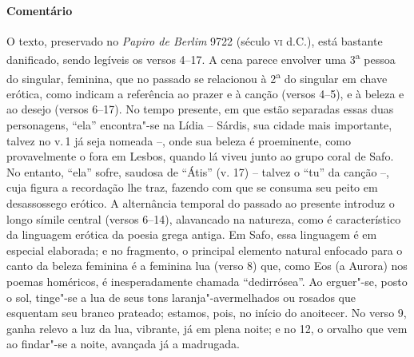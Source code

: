 {\paragraph{Comentário} O texto, preservado no \textit{Papiro de Berlim} 9722 (século \textsc{vi}
d.C.), está bastante danificado, sendo legíveis os versos 4--17.
A cena parece envolver uma 3\textsuperscript{a} pessoa do
singular, feminina, que no passado se relacionou à 2\textsuperscript{a} do
singular em chave erótica, como indicam a referência ao prazer e à canção		
(versos 4--5), e à beleza e ao desejo (versos 6--17). No tempo presente, 
em que estão separadas essas duas personagens, ``ela” encontra"-se na Lídia -- Sárdis, sua cidade mais importante, talvez no v.\,1 já seja nomeada --, onde sua beleza é proeminente, como provavelmente o fora em Lesbos, quando lá viveu junto ao grupo coral de Safo. No entanto, ``ela” sofre, saudosa de ``Átis” (v.
17) -- talvez o ``tu” da canção --, cuja figura a recordação lhe traz, fazendo
com que se consuma seu peito em desassossego erótico. A alternância temporal do
passado ao presente introduz o longo símile central (versos 6--14), alavancado
na natureza, como é característico da linguagem erótica da poesia grega antiga.
Em Safo, essa linguagem é em especial elaborada; e no fragmento, o principal
elemento natural enfocado para o canto da beleza feminina é a feminina lua
(verso 8) que, como Eos (a Aurora) nos poemas homéricos, é inesperadamente
chamada ``dedirrósea”. Ao erguer"-se, posto o sol, tinge"-se a lua
de seus tons laranja"-avermelhados ou rosados que esquentam seu branco prateado;
estamos, pois, no início do anoitecer. No verso 9, ganha relevo a luz da lua,
vibrante, já em plena noite; e no 12, o orvalho que vem ao findar"-se a noite,
avançada já a madrugada.

}

